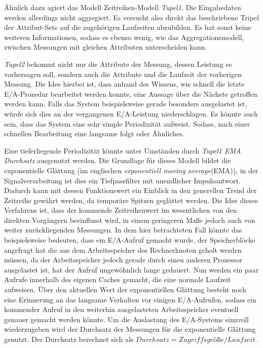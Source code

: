 \documentclass[
	12pt,
	a4paper,
	BCOR10mm,
	DIV14,
	listof=totoc,
	bibliography=totoc,
	headsepline
]{scrreprt}
\begin{document}
Ähnlich dazu agiert das Modell Zeitreihen-Modell \textit{Tupel1}. Die Eingabedaten werden allerdings nicht aggregiert.
Es versucht also direkt das beschriebene Tripel der Attribut-Sets auf die zugehörigen Laufzeiten abzubilden. Es hat sonst keine weiteren Informationen, sodass es ebenso wenig, wie das Aggregationsmodell, zwischen Messungen mit gleichen Attributen unterscheiden kann.

\textit{Tupel2} bekommt nicht nur die Attribute der Messung, dessen Leistung es vorhersagen soll, sondern auch die Attribute und die Laufzeit der vorherigen Messung.
Die Idee hierbei ist, dass anhand des Wissens, wie schnell die letzte E/A-Prozedur bearbeitet werden konnte, eine Aussage über die Nächste getroffen werden kann. Falls das System beispielsweise gerade besonders ausgelastet ist, würde sich dies an der vergangenen E/A-Leistung niederschlagen.
Es könnte auch sein, dass das System eine sehr simple Periodizität aufweist. Sodass, nach einer schnellen Bearbeitung eine langsame folgt oder Ähnliches.

Eine tieferliegende Periodizität könnte unter Umständen durch \textit{Tupel1 EMA Durchsatz} ausgenutzt werden. Die Grundlage für dieses Modell bildet die exponentielle Glättung (im englischen \textit{exponentiell moving average}(EMA)), in der Signalverarbeitung ist dies ein Tiefpassfilter mit unendlicher Impulsantwort.
Dadurch kann mit dessen Funktionswert ein Einblick in den generellen Trend der Zeitreihe gewährt werden, da temporäre Spitzen geglättet werden. Die Idee dieses Verfahrens ist, dass der kommende Zeitreihenwert im wesentlichen von den direkten Vorgängern beeinflusst wird, in einem geringeren Maße jedoch auch von weiter zurückliegenden Messungen.
In dem hier betrachteten Fall könnte das beispielsweise bedeuten, dass ein E/A-Aufruf gemacht wurde, der Speicherblöcke angefragt hat die aus dem Arbeitsspeicher des Rechnerknoten geholt werden müssen, da der Arbeitsspeicher jedoch gerade durch einen anderen Prozessor ausgelastet ist, hat der Aufruf ungewöhnlich lange gedauert. Nun werden ein paar Aufrufe innerhalb des eigenen Caches gemacht, die eine normale Laufzeit aufweisen. Über den aktuellen Wert der exponentiellen Glättung besteht noch eine Erinnerung an das langsame Verhalten vor einigen E/A-Aufrufen, sodass ein kommender Aufruf in den weiterhin ausgelasteten Arbeitsspeicher eventuell genauer gemacht werden könnte.
Um die Auslastung des E/A-Systems sinnvoll wiederzugeben wird der Durchsatz der Messungen für die exponentielle Glättung genutzt. Der Durchsatz berechnet sich als $Durchsatz = Zugriffsgrö\text{ß}e / Laufzeit$.
\end{document}
